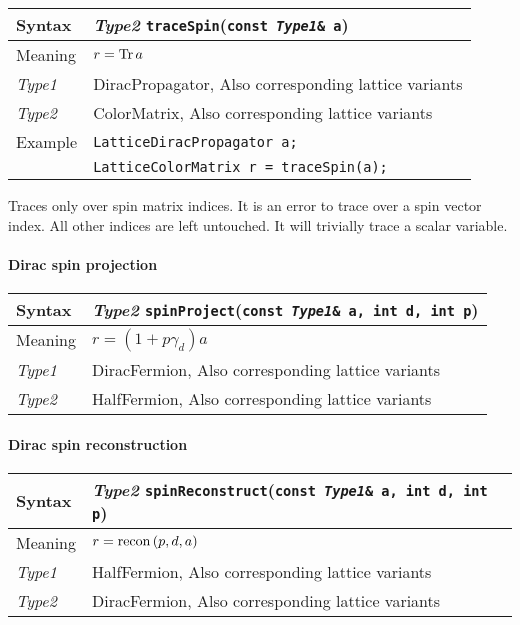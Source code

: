 \documentclass[12pt,letterpaper]{article}
\newcommand{\Tr}{\mathop{\rm Tr}}
\newcommand{\tLatticeColorMatrix}{LatticeColorMatrix}
\newcommand{\tLatticeDiracPropagator}{LatticeDiracPropagator}
\newcommand{\tColorMatrix}{ColorMatrix}
\newcommand{\tHalfFermion}{HalfFermion}
\newcommand{\tDiracFermion}{DiracFermion}
\newcommand{\tDiracPropagator}{DiracPropagator}
\newcommand{\simLatticeVariants}{Also corresponding lattice variants}
\begin{document}
\begin{flushleft}
  \begin{tabular}{|l|l|}
  \hline
  Syntax      & {\it Type2} \verb|traceSpin|({\tt const {\it Type1}\& a})\\
  \hline
  Meaning     & $r = \Tr a$ \\
  \hline
  {\it Type1} & \tDiracPropagator, \simLatticeVariants\\
  {\it Type2} & \tColorMatrix, \simLatticeVariants\\
  \hline
  \hline
  Example     & {\tt \tLatticeDiracPropagator{} a;}\\
              & {\tt \tLatticeColorMatrix{} r = traceSpin(a);} \\
  \hline
  \end{tabular}
\end{flushleft}

Traces only over spin matrix indices. It is an error to trace over a
spin vector index.  All other indices are left untouched.  It will
trivially trace a scalar variable.

\paragraph{Dirac spin projection}

\begin{flushleft}
  \begin{tabular}{|l|l|}
  \hline 
  Syntax      & {\it Type2} \verb|spinProject|({\tt const {\it Type1}\& a, int d, int p})\\
  \hline
  Meaning     & $r = (1 + p\gamma_d)a$\\
  \hline
  {\it Type1} & \tDiracFermion, \simLatticeVariants\\
  {\it Type2} & \tHalfFermion, \simLatticeVariants\\
  \hline
  \end{tabular}
\end{flushleft}

\paragraph{Dirac spin reconstruction}

\begin{flushleft}
  \begin{tabular}{|l|l|}
  \hline
  Syntax      & {\it Type2} \verb|spinReconstruct|({\tt const {\it Type1}\& a, int d, int p})\\
  \hline
  Meaning     & $r = {\rm recon\,}(p,d,a)$\\
  \hline
  {\it Type1} & \tHalfFermion, \simLatticeVariants\\
  {\it Type2} & \tDiracFermion, \simLatticeVariants\\
  \hline
  \end{tabular}
\end{flushleft}
\end{document}
